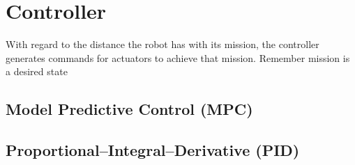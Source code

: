\chapter{Controller}

With regard to the distance the robot has with its mission, the controller generates commands for actuators to achieve that mission. Remember mission is a desired state
\section{Model Predictive Control (MPC)}
\section{Proportional–Integral–Derivative (PID)}